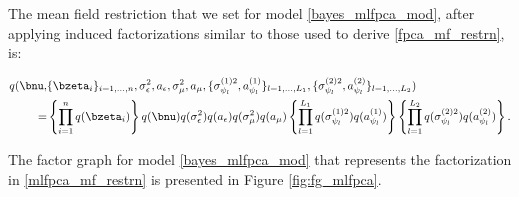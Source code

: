 \documentclass[ba]{imsart}
\numberwithin{equation}{section}
\theoremstyle{plain}
\def\sigsqeps{\sigma^2_{\epsilon}}
\def\aeps{a_{\epsilon}}
\def\sigsqmu{\sigma^2_{\mu}}
\def\amu{a_{\mu}}
\newcommand\sigsqpsiL[2]{\sigma^{(#1) 2}_{\psi_{#2}}}
\newcommand\apsiL[2]{a^{(#1)}_{\psi_{#2}}}
\begin{document}
The mean field restriction that we set for model \eqref{bayes_mlfpca_mod}, after applying induced
factorizations similar to those used to derive \eqref{fpca_mf_restrn}, is:

\begin{align}
\begin{split}
	q (
		\bnu, &\{ \bzeta_i \}_{i = 1, \dots, n},
		\sigsqeps, \aeps, \sigsqmu, \amu,
		\{ \sigsqpsiL{1}{l}, \apsiL{1}{l} \}_{l = 1, \dots, L_1},
		\{ \sigsqpsiL{2}{l}, \apsiL{2}{l} \}_{l = 1, \dots, L_2}) \\
		=
			&\left\{ \prod_{i=1}^n q (\bzeta_i) \right\}
			q (\bnu) q(\sigsqeps) q(\aeps) q(\sigsqmu) q (\amu)
			\left\{ \prod_{l=1}^{L_1} q(\sigsqpsiL{1}{l}) q(\apsiL{1}{l}) \right\}
			\left\{ \prod_{l=1}^{L_2} q(\sigsqpsiL{2}{l}) q(\apsiL{2}{l}) \right\}.
\end{split}
\label{mlfpca_mf_restrn}
\end{align}

\noindent The factor graph for model \eqref{bayes_mlfpca_mod} that represents the factorization in
\eqref{mlfpca_mf_restrn} is presented in Figure \ref{fig:fg_mlfpca}.
\end{document}
